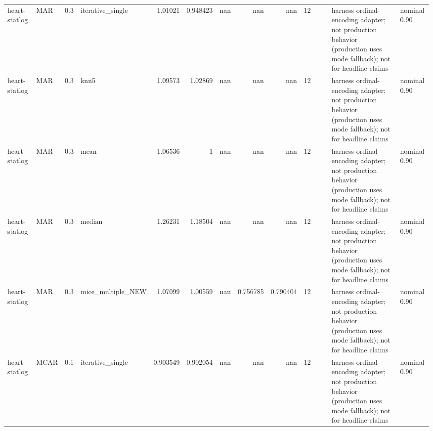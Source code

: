 \begin{table}[ht]
\begin{tabular}{llrlrrrrrrllll}
 heart-statlog        & MAR         &         0.3 & iterative\_single  &       1.01021  &             0.948423 &               nan        &                     nan        &                       nan        &        12 &                    &                                         & harness ordinal-encoding adapter; not production behavior (production uses mode fallback); not for headline claims & nominal 0.90              \\
 heart-statlog        & MAR         &         0.3 & knn5              &       1.09573  &             1.02869  &               nan        &                     nan        &                       nan        &        12 &                    &                                         & harness ordinal-encoding adapter; not production behavior (production uses mode fallback); not for headline claims & nominal 0.90              \\
 heart-statlog        & MAR         &         0.3 & mean              &       1.06536  &             1        &               nan        &                     nan        &                       nan        &        12 &                    &                                         & harness ordinal-encoding adapter; not production behavior (production uses mode fallback); not for headline claims & nominal 0.90              \\
 heart-statlog        & MAR         &         0.3 & median            &       1.26231  &             1.18504  &               nan        &                     nan        &                       nan        &        12 &                    &                                         & harness ordinal-encoding adapter; not production behavior (production uses mode fallback); not for headline claims & nominal 0.90              \\
 heart-statlog        & MAR         &         0.3 & mice\_multiple\_NEW &       1.07099  &             1.00559  &               nan        &                       0.756785 &                         0.790404 &        12 &                    &                                         & harness ordinal-encoding adapter; not production behavior (production uses mode fallback); not for headline claims & nominal 0.90              \\
 heart-statlog        & MCAR        &         0.1 & iterative\_single  &       0.903549 &             0.902054 &               nan        &                     nan        &                       nan        &        12 &                    &                                         & harness ordinal-encoding adapter; not production behavior (production uses mode fallback); not for headline claims & nominal 0.90              \\

\end{tabular}
\end{table}

